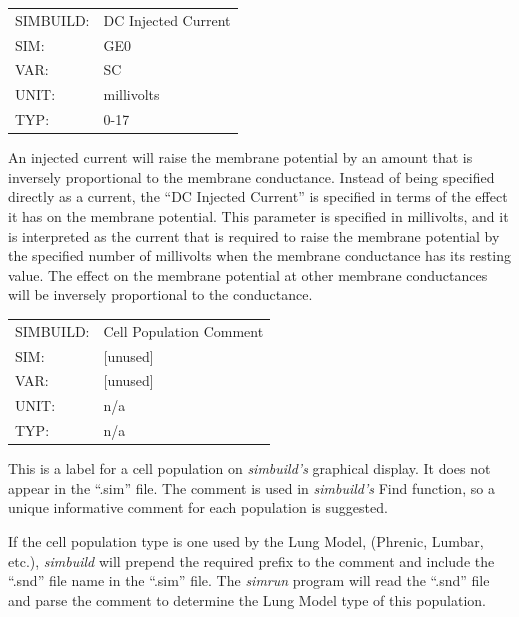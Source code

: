 \documentclass[12pt,openany,oneside]{book}
\newcommand{\prog}[1]{\textit{{#1}}}
\newcommand{\ext}[1]{{{``.#1''}}}
\newcommand{\inquotes}[1]{{{``#1''}}}
\begin{document}
\begin{flushleft}
\begin{tabular}{@{}ll@{}}
SIMBUILD: & DC Injected Current\\
SIM: & GE0\\
VAR: & SC\\
UNIT: & millivolts\\
TYP: & 0-17\\
\end{tabular}
\end{flushleft}
\noindent
An injected current will raise the membrane potential by an amount
that is inversely proportional to the membrane conductance. Instead
of being specified directly as a current, the \inquotes{DC Injected
Current}
is specified in terms of the effect it has on the membrane potential.
This parameter is specified in millivolts, and it is interpreted as
the current that is required to raise the membrane potential by the
specified number of millivolts when the membrane conductance has its
resting value. The effect on the membrane potential at other membrane
conductances will be inversely proportional to the conductance.
\filbreak
\vspace{\baselineskip}

\begin{flushleft}
\begin{tabular}{@{}ll@{}}
SIMBUILD: & Cell Population Comment\\
SIM: & [unused]\\
VAR: & [unused]\\
UNIT: & n/a\\
TYP: & n/a\\
\end{tabular}
\end{flushleft}
\noindent
This is a label for a cell population on \prog{simbuild's} graphical
display. It does not appear in the \ext{sim} file. The comment is used in
\prog{simbuild's} Find function, so a unique informative comment for 
each population is suggested.

If the cell population type is one used by the Lung Model, (Phrenic, Lumbar,
etc.), \prog{simbuild} will prepend the required prefix to the comment and
include the \ext{snd} file name in the \ext{sim} file. The \prog{simrun}
program will read the \ext{snd} file and parse the comment to determine
the Lung Model type of this population.
\filbreak
\vspace{\baselineskip}
\end{document}
